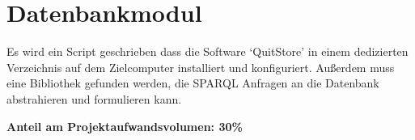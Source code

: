 \section{Datenbankmodul}
       
Es wird ein Script geschrieben dass die Software `QuitStore' in einem
dedizierten Verzeichnis auf dem Zielcomputer installiert und konfiguriert.
Außerdem muss eine Bibliothek gefunden werden, die SPARQL Anfragen an die
Datenbank abstrahieren und formulieren kann.

    \textbf{Anteil am Projektaufwandsvolumen: 30\%}
